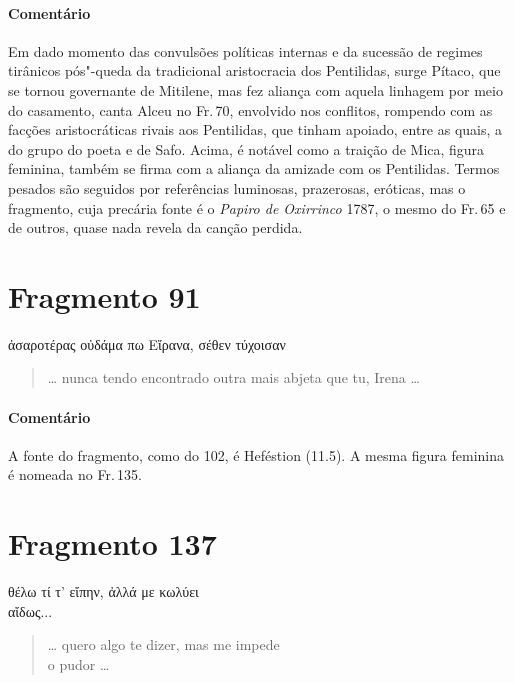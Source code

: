 \medskip

{\paragraph{Comentário} Em dado momento das convulsões políticas internas e da sucessão de regimes
tirânicos pós"-queda da tradicional aristocracia dos Pentilidas, surge Pítaco, que se tornou governante de
Mitilene, mas fez aliança com aquela linhagem por meio do casamento,
canta Alceu no Fr.\,70, envolvido nos conflitos,
rompendo com as facções aristocráticas rivais aos Pentilidas, que tinham apoiado, entre as quais, a
do grupo do poeta e de Safo. Acima, é notável como a traição de 
Mica, figura feminina, também se firma com a aliança da amizade com os Pentilidas. Termos
pesados são seguidos por referências luminosas, prazerosas, eróticas, mas o
fragmento, cuja precária fonte é o \textit{Papiro de Oxirrinco} 1787, o mesmo do Fr.\,65 e de outros, quase nada revela da canção perdida.}


\pagebreak
\section{Fragmento 91}

\begin{gkverse}
ἀσαροτέρας οὐδάμα πω Εἴρανα, σέθεν τύχοισαν
\end{gkverse}

\begin{verse}
\ldots{} nunca tendo encontrado outra mais abjeta que tu, Irena \ldots{}
\end{verse}

\medskip

{\paragraph{Comentário} A fonte do fragmento, como do 102, é Heféstion (11.5).
A mesma figura feminina é nomeada no Fr.\,135.}


\section{Fragmento 137}

\begin{gkverse}
θέλω τί τ’ εἴπην, ἀλλά με κωλύει\\
αἴδως...
\end{gkverse}

\begin{verse}
\ldots{} quero algo te dizer, mas me impede\\
o pudor \ldots{}
\end{verse}

